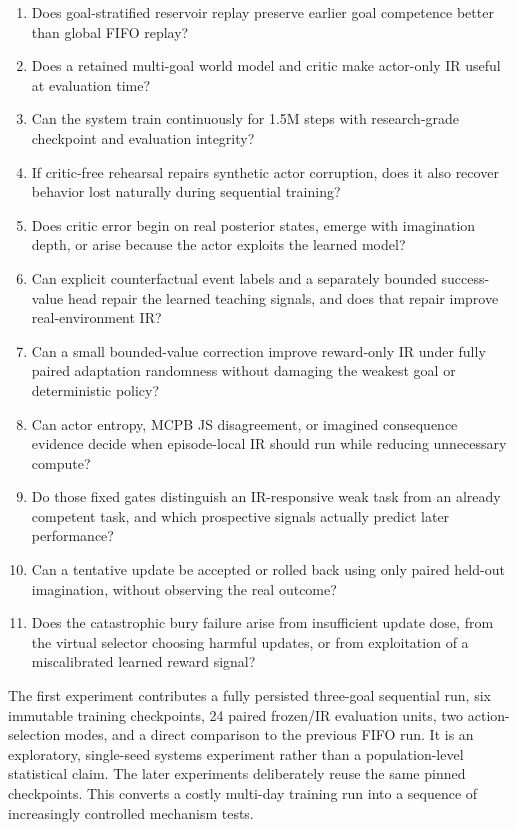 \documentclass[10pt]{article}
\begin{document}
\begin{enumerate}
  \item Does goal-stratified reservoir replay preserve earlier goal competence better than global FIFO replay?
  \item Does a retained multi-goal world model and critic make actor-only IR useful at evaluation time?
  \item Can the system train continuously for 1.5M steps with research-grade checkpoint and evaluation integrity?
  \item If critic-free rehearsal repairs synthetic actor corruption, does it also recover behavior lost naturally during sequential training?
  \item Does critic error begin on real posterior states, emerge with imagination depth, or arise because the actor exploits the learned model?
  \item Can explicit counterfactual event labels and a separately bounded success-value head repair the learned teaching signals, and does that repair improve real-environment IR?
  \item Can a small bounded-value correction improve reward-only IR under fully paired adaptation randomness without damaging the weakest goal or deterministic policy?
  \item Can actor entropy, MCPB JS disagreement, or imagined consequence evidence decide when episode-local IR should run while reducing unnecessary compute?
  \item Do those fixed gates distinguish an IR-responsive weak task from an already competent task, and which prospective signals actually predict later performance?
  \item Can a tentative update be accepted or rolled back using only paired held-out imagination, without observing the real outcome?
  \item Does the catastrophic bury failure arise from insufficient update dose, from the virtual selector choosing harmful updates, or from exploitation of a miscalibrated learned reward signal?
\end{enumerate}

The first experiment contributes a fully persisted three-goal sequential run, six immutable training checkpoints, 24 paired frozen/IR evaluation units, two action-selection modes, and a direct comparison to the previous FIFO run. It is an exploratory, single-seed systems experiment rather than a population-level statistical claim. The later experiments deliberately reuse the same pinned checkpoints. This converts a costly multi-day training run into a sequence of increasingly controlled mechanism tests.
\end{document}
